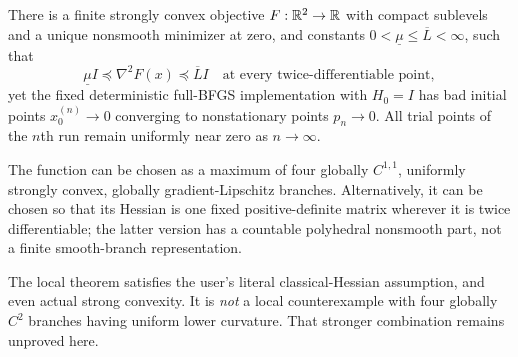 \begin{theorem}\label{L:thm:local}
There is a finite strongly convex objective $F:\mathbb R^2\to\mathbb R$ with compact sublevels and a unique nonsmooth minimizer at zero, and constants $0<\underline\mu\le\overline L<\infty$, such that
\[
 \underline\mu I\preceq \nabla^2F(x)\preceq\overline L I
 \quad\text{at every twice-differentiable point},
\]
yet the fixed deterministic full-BFGS implementation with $H_0=I$ has bad initial points $x_0^{(n)}\to0$ converging to nonstationary points $p_n\to0$. All trial points of the $n$th run remain uniformly near zero as $n\to\infty$.

The function can be chosen as a maximum of four globally $C^{1,1}$, uniformly strongly convex, globally gradient-Lipschitz branches. Alternatively, it can be chosen so that its Hessian is one fixed positive-definite matrix wherever it is twice differentiable; the latter version has a countable polyhedral nonsmooth part, not a finite smooth-branch representation.
\end{theorem}
\noindent The local theorem satisfies the user's literal classical-Hessian assumption, and even actual strong convexity. It is \emph{not} a local counterexample with four globally $C^2$ branches having uniform lower curvature. That stronger combination remains unproved here.


\setcounter{section}{1}
\setcounter{theorem}{2}
\setcounter{lemma}{0}
\setcounter{corollary}{0}
\setcounter{proposition}{0}
\setcounter{remark}{0}
\setcounter{equation}{0}
